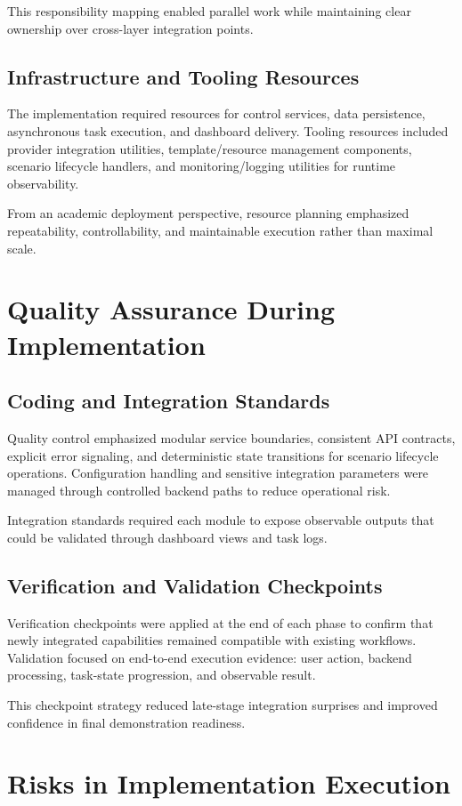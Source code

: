 This responsibility mapping enabled parallel work while maintaining clear ownership over cross-layer integration points.

\subsection{Infrastructure and Tooling Resources}
The implementation required resources for control services, data persistence, asynchronous task execution, and dashboard delivery. Tooling resources included provider integration utilities, template/resource management components, scenario lifecycle handlers, and monitoring/logging utilities for runtime observability.

From an academic deployment perspective, resource planning emphasized repeatability, controllability, and maintainable execution rather than maximal scale.

\section{Quality Assurance During Implementation}
\subsection{Coding and Integration Standards}
Quality control emphasized modular service boundaries, consistent API contracts, explicit error signaling, and deterministic state transitions for scenario lifecycle operations. Configuration handling and sensitive integration parameters were managed through controlled backend paths to reduce operational risk.

Integration standards required each module to expose observable outputs that could be validated through dashboard views and task logs.

\subsection{Verification and Validation Checkpoints}
Verification checkpoints were applied at the end of each phase to confirm that newly integrated capabilities remained compatible with existing workflows. Validation focused on end-to-end execution evidence: user action, backend processing, task-state progression, and observable result.

This checkpoint strategy reduced late-stage integration surprises and improved confidence in final demonstration readiness.

\section{Risks in Implementation Execution}

